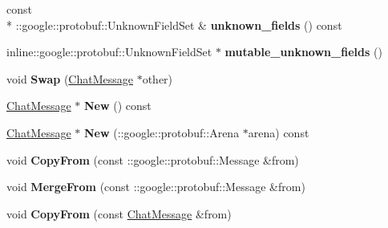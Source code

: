 \begin{DoxyCompactItemize}
\item 
\hypertarget{classSimpleChat_1_1ChatMessage_a261d1bfeea73eb6eb16ecaf27d770be1}{const \\*
\-::google\-::protobuf\-::\-Unknown\-Field\-Set \& {\bfseries unknown\-\_\-fields} () const }\label{classSimpleChat_1_1ChatMessage_a261d1bfeea73eb6eb16ecaf27d770be1}

\item 
\hypertarget{classSimpleChat_1_1ChatMessage_a6ddd70adfef9a10e694f12350ae29382}{inline\-::google\-::protobuf\-::\-Unknown\-Field\-Set $\ast$ {\bfseries mutable\-\_\-unknown\-\_\-fields} ()}\label{classSimpleChat_1_1ChatMessage_a6ddd70adfef9a10e694f12350ae29382}

\item 
\hypertarget{classSimpleChat_1_1ChatMessage_a8d7cf0c94da9a697d77641dfd9a17310}{void {\bfseries Swap} (\hyperlink{classSimpleChat_1_1ChatMessage}{Chat\-Message} $\ast$other)}\label{classSimpleChat_1_1ChatMessage_a8d7cf0c94da9a697d77641dfd9a17310}

\item 
\hypertarget{classSimpleChat_1_1ChatMessage_a0837c7d0ab99ab83af09f4d695c5fa2b}{\hyperlink{classSimpleChat_1_1ChatMessage}{Chat\-Message} $\ast$ {\bfseries New} () const }\label{classSimpleChat_1_1ChatMessage_a0837c7d0ab99ab83af09f4d695c5fa2b}

\item 
\hypertarget{classSimpleChat_1_1ChatMessage_a8bfb7e74e37956c08734a8ad0e165746}{\hyperlink{classSimpleChat_1_1ChatMessage}{Chat\-Message} $\ast$ {\bfseries New} (\-::google\-::protobuf\-::\-Arena $\ast$arena) const }\label{classSimpleChat_1_1ChatMessage_a8bfb7e74e37956c08734a8ad0e165746}

\item 
\hypertarget{classSimpleChat_1_1ChatMessage_ab76ad9474fddf3fff5e8ac32baced6f9}{void {\bfseries Copy\-From} (const \-::google\-::protobuf\-::\-Message \&from)}\label{classSimpleChat_1_1ChatMessage_ab76ad9474fddf3fff5e8ac32baced6f9}

\item 
\hypertarget{classSimpleChat_1_1ChatMessage_a08b1dd53a5f0883e4b1c654d0d42c41f}{void {\bfseries Merge\-From} (const \-::google\-::protobuf\-::\-Message \&from)}\label{classSimpleChat_1_1ChatMessage_a08b1dd53a5f0883e4b1c654d0d42c41f}

\item 
\hypertarget{classSimpleChat_1_1ChatMessage_a9d0c6023de82cce729a4adfd0dab3fff}{void {\bfseries Copy\-From} (const \hyperlink{classSimpleChat_1_1ChatMessage}{Chat\-Message} \&from)}\label{classSimpleChat_1_1ChatMessage_a9d0c6023de82cce729a4adfd0dab3fff}


\end{DoxyCompactItemize}
